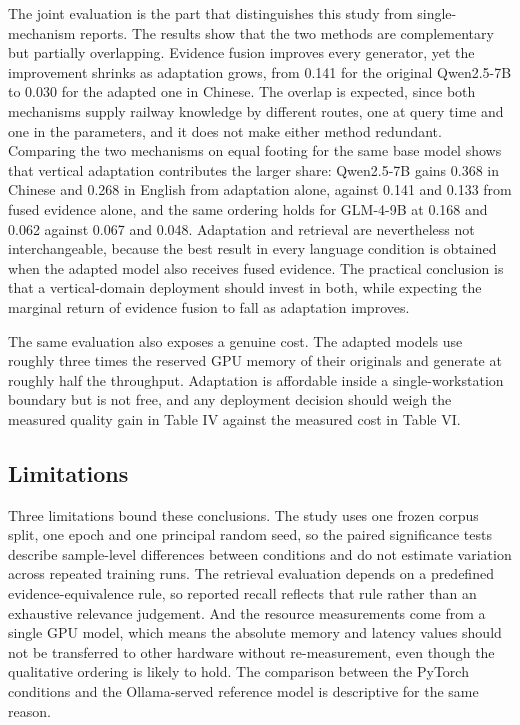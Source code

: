 \documentclass{article}
\begin{document}
The joint evaluation is the part that distinguishes this study from single-mechanism reports. The results show that the two methods are complementary but partially overlapping. Evidence fusion improves every generator, yet the improvement shrinks as adaptation grows, from 0.141 for the original Qwen2.5-7B to 0.030 for the adapted one in Chinese. The overlap is expected, since both mechanisms supply railway knowledge by different routes, one at query time and one in the parameters, and it does not make either method redundant. Comparing the two mechanisms on equal footing for the same base model shows that vertical adaptation contributes the larger share: Qwen2.5-7B gains 0.368 in Chinese and 0.268 in English from adaptation alone, against 0.141 and 0.133 from fused evidence alone, and the same ordering holds for GLM-4-9B at 0.168 and 0.062 against 0.067 and 0.048. Adaptation and retrieval are nevertheless not interchangeable, because the best result in every language condition is obtained when the adapted model also receives fused evidence. The practical conclusion is that a vertical-domain deployment should invest in both, while expecting the marginal return of evidence fusion to fall as adaptation improves.

The same evaluation also exposes a genuine cost. The adapted models use roughly three times the reserved GPU memory of their originals and generate at roughly half the throughput. Adaptation is affordable inside a single-workstation boundary but is not free, and any deployment decision should weigh the measured quality gain in Table IV against the measured cost in Table VI.

\subsection{Limitations}

Three limitations bound these conclusions. The study uses one frozen corpus split, one epoch and one principal random seed, so the paired significance tests describe sample-level differences between conditions and do not estimate variation across repeated training runs. The retrieval evaluation depends on a predefined evidence-equivalence rule, so reported recall reflects that rule rather than an exhaustive relevance judgement. And the resource measurements come from a single GPU model, which means the absolute memory and latency values should not be transferred to other hardware without re-measurement, even though the qualitative ordering is likely to hold. The comparison between the PyTorch conditions and the Ollama-served reference model is descriptive for the same reason.
\end{document}
